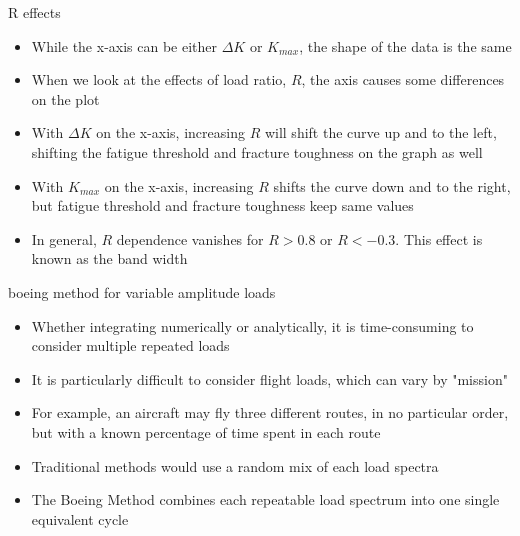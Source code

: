 \documentclass[10pt]{beamer}
\begin{document}
\begin{frame}{R effects}
	\begin{itemize}[<+->]
		\item While the x-axis can be either $\Delta K$ or $K_{max}$, the shape of the data is the same
		\item When we look at the effects of load ratio, $R$, the axis causes some differences on the plot
		\item With $\Delta K$ on the x-axis, increasing $R$ will shift the curve up and to the left, shifting the fatigue threshold and fracture toughness on the graph as well
		\item With $K_{max}$ on the x-axis, increasing $R$ shifts the curve down and to the right, but fatigue threshold and fracture toughness keep same values
		\item In general, $R$ dependence vanishes for $R> 0.8$ or $R<-0.3$. This effect is known as the band width
	\end{itemize}
\end{frame}

\begin{frame}{boeing method for variable amplitude loads}
	\begin{itemize}[<+->]
		\item Whether integrating numerically or analytically, it is time-consuming to consider multiple repeated loads
		\item It is particularly difficult to consider flight loads, which can vary by "mission"
		\item For example, an aircraft may fly three different routes, in no particular order, but with a known percentage of time spent in each route
		\item Traditional methods would use a random mix of each load spectra
		\item The Boeing Method combines each repeatable load spectrum into one single equivalent cycle
	\end{itemize}
\end{frame}
\end{document}
